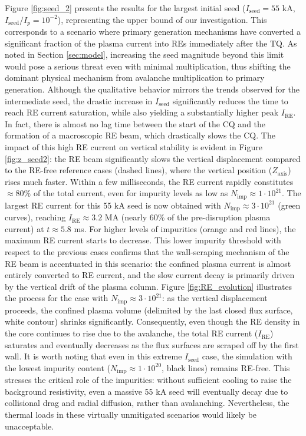 \documentclass[aip,reprint]{revtex4-1}
\begin{document}
Figure \ref{fig:seed_2} presents the results for the largest initial seed ($I_\text{seed} = 55$ kA, $I_\text{seed}/I_p = 10^{-2}$), representing the upper bound of our investigation. This corresponds to a scenario where primary generation mechanisms have converted a significant fraction of the plasma current into REs immediately after the TQ. As noted in Section \ref{sec:model}, increasing the seed magnitude beyond this limit would pose a serious threat even with minimal multiplication, thus shifting the dominant physical mechanism from avalanche multiplication to primary generation. Although the qualitative behavior mirrors the trends observed for the intermediate seed, the drastic increase in $I_\text{seed}$ significantly reduces the time to reach RE current saturation, while also yielding a substantially higher peak $I_\text{RE}$. In fact, there is almost no lag time between the start of the CQ and the formation of a macroscopic RE beam, which drastically slows the CQ. The impact of this high RE current on vertical stability is evident in Figure \ref{fig:z_seed2}: the RE beam significantly slows the vertical displacement compared to the RE-free reference cases (dashed lines), where the vertical position ($Z_\text{axis}$) rises much faster.
Within a few milliseconds, the RE current rapidly constitutes $\approx 80\%$ of the total current, even for impurity levels as low as $N_\text{imp} \approx 1\cdot10^{21}$. The largest RE current for this 55 kA seed is now obtained with $N_\text{imp} \approx 3\cdot10^{21}$ (green curves), reaching $I_\text{RE} \approx 3.2$ MA (nearly 60\% of the pre-disruption plasma current) at $t \approx 5.8$ ms. For higher levels of impurities (orange and red lines), the maximum RE current starts to decrease. This lower impurity threshold with respect to the previous cases confirms that the wall-scraping mechanism of the RE beam is accentuated in this scenario: the confined plasma current is almost entirely converted to RE current, and the slow current decay is primarily driven by the vertical drift of the plasma column. Figure \ref{fig:RE_evolution} illustrates the process for the case with $N_\text{imp} \approx 3\cdot10^{21}$: as the vertical displacement proceeds, the confined plasma volume (delimited by the last closed flux surface, white contour) shrinks significantly. Consequently, even though the RE density in the core continues to rise due to the avalanche, the total RE current ($I_\text{RE}$) saturates and eventually decreases as the flux surfaces are scraped off by the first wall. 
It is worth noting that even in this extreme $I_\text{seed}$ case, the simulation with the lowest impurity content ($N_\text{imp} \approx 1\cdot10^{20}$, black lines) remains RE-free. This stresses the critical role of the impurities: without sufficient cooling to raise the background resistivity, even a massive 55 kA seed will eventually decay due to collisional drag and radial diffusion, rather than avalanching. Nevertheless, the thermal loads in these virtually unmitigated scenarios would likely be unacceptable.
\end{document}
